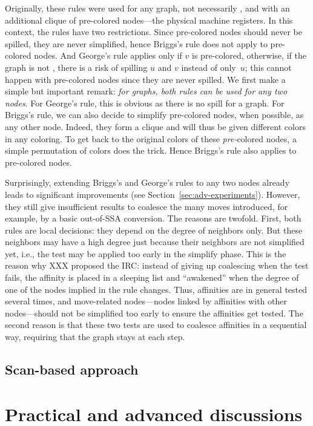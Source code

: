 {Originally, these rules were used for any graph, not necessarily , and with an additional clique of pre-colored nodes---the physical machine registers. 
In this context, the rules have two restrictions. 
Since pre-colored nodes should never be spilled, they are never simplified, hence Briggs's rule does not apply to pre-colored nodes. 
And George's rule applies only if $v$ is pre-colored, otherwise, if the graph is not , there is a risk of spilling $u$ and $v$ instead of only~$u$; 
this cannot happen with pre-colored nodes since they are never spilled. 
We first make a simple but important remark: 
\emph{for  graphs, both rules can be used for any two nodes}. 
For George's rule, this is obvious as there is no spill for a  graph. 
For Briggs's rule, we can also decide to simplify pre-colored nodes, when possible, as any other node. 
Indeed, they form a clique and will thus be given different colors in any coloring. 
To get back to the original colors of these \emph{pre-}colored nodes, a simple permutation of colors does the trick. 
Hence Briggs's rule also applies to pre-colored nodes.

Surprisingly, extending Briggs's and George's rules to any two nodes already leads to significant improvements (see Section~\ref{sec:adv-experiments}). 
However, they still give insufficient results to coalesce the many moves introduced, for example, by a basic out-of-{SSA} conversion. 
The reasons are twofold. 
First, both rules are local decisions: 
they depend on the degree of neighbors only. 
But these neighbors may have a high degree just because their neighbors are not simplified yet, i.e., the test may be applied too early in the simplify phase. 
This is the reason why XXX proposed the IRC: 
instead of giving up coalescing when the test fails, the affinity is placed in a sleeping list and ``awakened'' when the degree of one of the nodes implied in the rule changes. 
Thus, affinities are in general tested several times, and move-related nodes---nodes linked by affinities with other nodes---should not be simplified too early to ensure the affinities get tested. 
The second reason is that these two tests are used to coalesce affinities in a sequential way, requiring that the graph stays  at each step.
\subsection{Scan-based approach}

\section{Practical and advanced discussions}
\label{sec:practical-regalloc}


}
